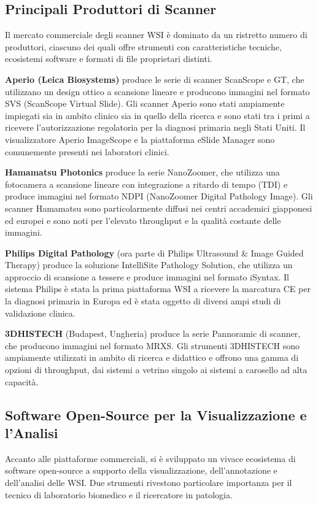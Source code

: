 \subsection{Principali Produttori di Scanner}

Il mercato commerciale degli scanner WSI è dominato da un ristretto numero di produttori, ciascuno dei quali offre strumenti con caratteristiche tecniche, ecosistemi software e formati di file proprietari distinti.

\textbf{Aperio (Leica Biosystems)} produce le serie di scanner ScanScope e GT, che utilizzano un design ottico a scansione lineare e producono immagini nel formato SVS (ScanScope Virtual Slide). Gli scanner Aperio sono stati ampiamente impiegati sia in ambito clinico sia in quello della ricerca e sono stati tra i primi a ricevere l'autorizzazione regolatoria per la diagnosi primaria negli Stati Uniti. Il visualizzatore Aperio ImageScope e la piattaforma eSlide Manager sono comunemente presenti nei laboratori clinici.

\textbf{Hamamatsu Photonics} produce la serie NanoZoomer, che utilizza una fotocamera a scansione lineare con integrazione a ritardo di tempo (TDI) e produce immagini nel formato NDPI (NanoZoomer Digital Pathology Image). Gli scanner Hamamatsu sono particolarmente diffusi nei centri accademici giapponesi ed europei e sono noti per l'elevato throughput e la qualità costante delle immagini.

\textbf{Philips Digital Pathology} (ora parte di Philips Ultrasound \& Image Guided Therapy) produce la soluzione IntelliSite Pathology Solution, che utilizza un approccio di scansione a tessere e produce immagini nel formato iSyntax. Il sistema Philips è stata la prima piattaforma WSI a ricevere la marcatura CE per la diagnosi primaria in Europa ed è stata oggetto di diversi ampi studi di validazione clinica.

\textbf{3DHISTECH} (Budapest, Ungheria) produce la serie Pannoramic di scanner, che producono immagini nel formato MRXS. Gli strumenti 3DHISTECH sono ampiamente utilizzati in ambito di ricerca e didattico e offrono una gamma di opzioni di throughput, dai sistemi a vetrino singolo ai sistemi a carosello ad alta capacità.

\subsection{Software Open-Source per la Visualizzazione e l'Analisi}

Accanto alle piattaforme commerciali, si è sviluppato un vivace ecosistema di software open-source a supporto della visualizzazione, dell'annotazione e dell'analisi delle WSI. Due strumenti rivestono particolare importanza per il tecnico di laboratorio biomedico e il ricercatore in patologia.

